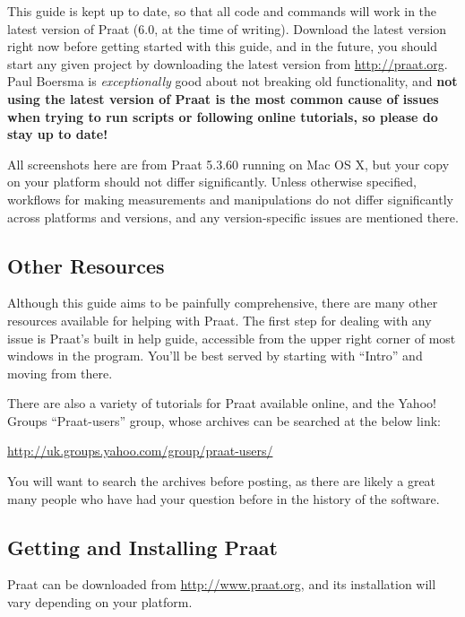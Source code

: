This guide is kept up to date, so that all code and commands will work
in the latest version of Praat (6.0, at the time of writing). Download
the latest version right now before getting started with this guide, and
in the future, you should start any given project by downloading the
latest version from \url{http://praat.org}. Paul Boersma is
\emph{exceptionally} good about not breaking old functionality, and
\textbf{not using the latest version of Praat is the most common cause
of issues when trying to run scripts or following online tutorials, so
please do stay up to date!}

All screenshots here are from Praat 5.3.60 running on Mac OS X, but your
copy on your platform should not differ significantly. Unless otherwise
specified, workflows for making measurements and manipulations do not
differ significantly across platforms and versions, and any
version-specific issues are mentioned there.

\hypertarget{other-resources}{%
\subsection{Other Resources}\label{other-resources}}

\label{sec:otherresources}

Although this guide aims to be painfully comprehensive, there are many
other resources available for helping with Praat. The first step for
dealing with any issue is Praat's built in help guide, accessible from
the upper right corner of most windows in the program. You'll be best
served by starting with ``Intro'' and moving from there.

There are also a variety of tutorials for Praat available online, and
the Yahoo! Groups ``Praat-users'' group, whose archives can be searched
at the below link:

\url{http://uk.groups.yahoo.com/group/praat-users/}

You will want to search the archives before posting, as there are likely
a great many people who have had your question before in the history of
the software.

\hypertarget{getting-and-installing-praat}{%
\subsection{Getting and Installing
Praat}\label{getting-and-installing-praat}}

Praat can be downloaded from \url{http://www.praat.org}, and its
installation will vary depending on your platform.

